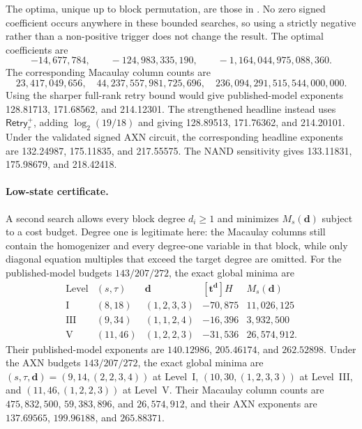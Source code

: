 \documentclass[11pt]{article}
\begin{document}
The optima, unique up
to block permutation, are
those in .  No zero signed coefficient occurs anywhere
in these bounded searches, so using a strictly negative rather than a
non-positive trigger does not change the result.  The optimal coefficients are
\[
 -14{,}677{,}784,\qquad
 -124{,}983{,}335{,}190,\qquad
 -1{,}164{,}044{,}975{,}088{,}360.
\]
The corresponding Macaulay column counts are
\[
 23{,}417{,}049{,}656,
 \quad 44{,}237{,}557{,}981{,}725{,}696,
 \quad 236{,}094{,}291{,}515{,}544{,}000{,}000.
\]
Using the sharper full-rank retry bound would give published-model exponents
128.81713, 171.68562, and 214.12301.  The strengthened headline instead uses
$\mathsf{Retry}^{+}_{\tau}$, adding $\log_2(19/18)$ and giving
128.89513, 171.76362, and 214.20101.  Under the validated signed AXN circuit,
the corresponding headline exponents are 132.24987, 175.11835, and
217.55575.  The NAND sensitivity gives 133.11831, 175.98679, and 218.42418.

\paragraph{Low-state certificate.}
A second search allows every block degree $d_i\ge1$ and minimizes
$M_s(\mathbf d)$ subject to a cost budget.  Degree one is legitimate here:
the Macaulay columns still contain the homogenizer and every degree-one
variable in that block, while only diagonal equation multiples that exceed the
target degree are omitted.  For the published-model budgets $143/207/272$,
the exact global minima are
\[
\begin{array}{c|c|c|r|r}
\text{Level}&(s,\tau)&\mathbf d&[\mathbf t^{\mathbf d}]H&M_s(\mathbf d)\\\hline
\mathrm I&(8,18)&(1,2,3,3)&-70{,}875&11{,}026{,}125\\
\mathrm{III}&(9,34)&(1,1,2,4)&-16{,}396&3{,}932{,}500\\
\mathrm V&(11,46)&(1,2,2,3)&-31{,}536&26{,}574{,}912.
\end{array}
\]
Their published-model exponents are $140.12986$, $205.46174$, and
$262.52898$.  Under the AXN budgets $143/207/272$, the exact global minima are
$(s,\tau,\mathbf d)=(9,14,(2,2,3,4))$ at Level~I,
$(10,30,(1,2,3,3))$ at Level~III, and
$(11,46,(1,2,2,3))$ at Level~V.  Their Macaulay column counts are
$475{,}832{,}500$, $59{,}383{,}896$, and $26{,}574{,}912$, and their AXN
exponents are $137.69565$, $199.96188$, and $265.88371$.
\end{document}

